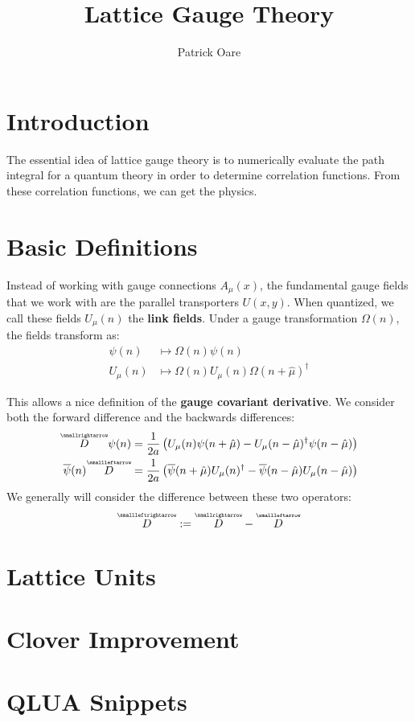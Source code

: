 \documentclass[11pt, oneside]{article}   	%
\title{Lattice Gauge Theory}
\author{Patrick Oare}
\date{}							%
\theoremstyle{definition}
\newcommand{\vecc}[1]{\overset{\scriptscriptstyle\smallrightarrow}{#1}}
\newcommand{\cev}[1]{\overset{\scriptscriptstyle\smallleftarrow}{#1}}
\newcommand{\cevvec}[1]{\overset{\scriptscriptstyle\smallleftrightarrow}{#1}}
\begin{document}
\maketitle

\section{Introduction}

The essential idea of lattice gauge theory is to numerically evaluate the path integral for a quantum theory in order to determine 
correlation functions. From these correlation functions, we can get the physics. 

\section{Basic Definitions}

Instead of working with gauge connections $A_\mu(x)$, the fundamental gauge fields that we work with are the parallel 
transporters $U(x, y)$. When quantized, we call these fields $U_\mu(n)$ the \textbf{link fields}. Under a gauge transformation 
$\Omega(n)$, the fields transform as:
\begin{align}
	\psi(n)&\mapsto \Omega(n)\psi(n) \\
	U_\mu(n)&\mapsto \Omega(n) U_\mu(n) \Omega(n + \hat\mu)^\dagger
\end{align}

This allows a nice definition of the \textbf{gauge covariant derivative}. We consider both the forward difference and the 
backwards differences:
\begin{align}
	\vecc D\psi(n) &= \frac{1}{2a}\left(U_\mu(n)\psi(n + \hat\mu) - U_\mu(n - \hat\mu)^\dagger\psi(n - \hat\mu)\right) \\
	\overline\psi(n) \cev{D}&= \frac{1}{2a}\left(\overline\psi(n + \hat\mu)U_\mu(n)^\dagger - \overline\psi(n - \hat\mu)U_\mu(n - 
	\hat\mu) \right)
\end{align}
We generally will consider the difference between these two operators:
\begin{equation}
	\cevvec{D} := \vecc D - \cev D
\end{equation}

\section{Lattice Units}

\section{Clover Improvement}

\section{QLUA Snippets}
\end{document}
